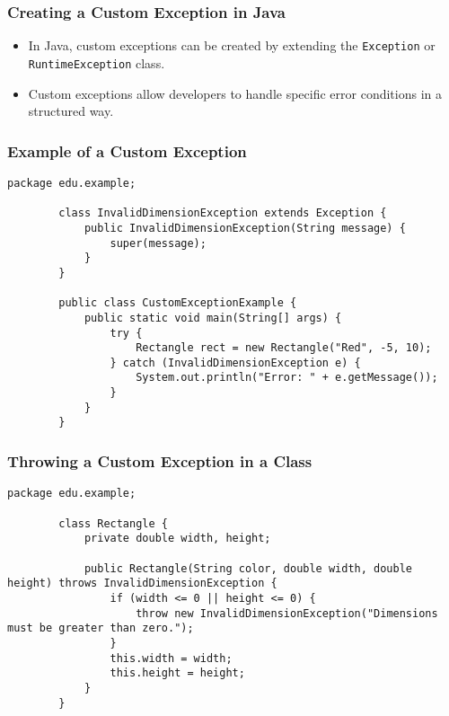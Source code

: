 \documentclass[aspectratio=169, table]{beamer}
\begin{document}
\begin{frame}[fragile]
	\frametitle{Creating a Custom Exception in Java}
	
	\begin{itemize}
		\item In Java, custom exceptions can be created by extending the \texttt{Exception} or \texttt{RuntimeException} class.
		\item Custom exceptions allow developers to handle specific error conditions in a structured way.
	\end{itemize}
\end{frame}

\begin{frame}[fragile]
	\frametitle{Example of a Custom Exception}
	
	\begin{lstlisting}[style=JavaStyle, caption={Custom Exception: \texttt{InvalidDimensionException.java}}]
		package edu.example;
		
		class InvalidDimensionException extends Exception {
			public InvalidDimensionException(String message) {
				super(message);
			}
		}
		
		public class CustomExceptionExample {
			public static void main(String[] args) {
				try {
					Rectangle rect = new Rectangle("Red", -5, 10);
				} catch (InvalidDimensionException e) {
					System.out.println("Error: " + e.getMessage());
				}
			}
		}
	\end{lstlisting}
\end{frame}

\begin{frame}[fragile]
	\frametitle{Throwing a Custom Exception in a Class}
	
	\begin{lstlisting}[style=JavaStyle, caption={Throwing a Custom Exception: \texttt{Rectangle.java}}]
		package edu.example;
		
		class Rectangle {
			private double width, height;
			
			public Rectangle(String color, double width, double height) throws InvalidDimensionException {
				if (width <= 0 || height <= 0) {
					throw new InvalidDimensionException("Dimensions must be greater than zero.");
				}
				this.width = width;
				this.height = height;
			}
		}
	\end{lstlisting}
\end{frame}
\end{document}
